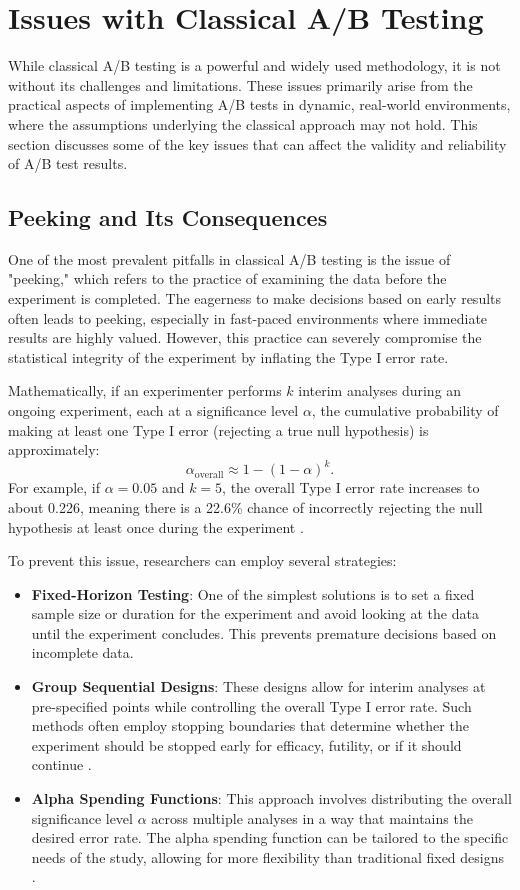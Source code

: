 \documentclass[magisterska, english]{pwr_wmat_praca_dyplomowa}
\theoremstyle{plain}
\numberwithin{theorem}{chapter}
\theoremstyle{definition}
\numberwithin{theorem}{chapter}
\begin{document}
\section{Issues with Classical A/B Testing}

While classical A/B testing is a powerful and widely used methodology, it is not without its challenges and limitations. These issues primarily arise from the practical aspects of implementing A/B tests in dynamic, real-world environments, where the assumptions underlying the classical approach may not hold. This section discusses some of the key issues that can affect the validity and reliability of A/B test results.

\subsection{Peeking and Its Consequences}

One of the most prevalent pitfalls in classical A/B testing is the issue of "peeking," which refers to the practice of examining the data before the experiment is completed. The eagerness to make decisions based on early results often leads to peeking, especially in fast-paced environments where immediate results are highly valued. However, this practice can severely compromise the statistical integrity of the experiment by inflating the Type I error rate.

Mathematically, if an experimenter performs $k$ interim analyses during an ongoing experiment, each at a significance level $\alpha$, the cumulative probability of making at least one Type I error (rejecting a true null hypothesis) is approximately:
\[
\alpha_{\text{overall}} \approx 1 - (1 - \alpha)^k.
\]
For example, if $\alpha = 0.05$ and $k = 5$, the overall Type I error rate increases to about 0.226, meaning there is a 22.6\% chance of incorrectly rejecting the null hypothesis at least once during the experiment \cite{Pocock1977}.

To prevent this issue, researchers can employ several strategies:
\begin{itemize}
	\item \textbf{Fixed-Horizon Testing}: One of the simplest solutions is to set a fixed sample size or duration for the experiment and avoid looking at the data until the experiment concludes. This prevents premature decisions based on incomplete data.
	\item \textbf{Group Sequential Designs}: These designs allow for interim analyses at pre-specified points while controlling the overall Type I error rate. Such methods often employ stopping boundaries that determine whether the experiment should be stopped early for efficacy, futility, or if it should continue \cite{Pocock1977}.
	\item \textbf{Alpha Spending Functions}: This approach involves distributing the overall significance level $\alpha$ across multiple analyses in a way that maintains the desired error rate. The alpha spending function can be tailored to the specific needs of the study, allowing for more flexibility than traditional fixed designs \cite{DeMets1994}.
\end{itemize}
\end{document}
